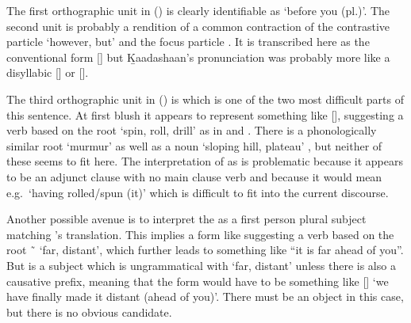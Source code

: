 The first orthographic unit  in (\lastx) is clearly identifiable as  ‘before you (pl.)’.
The second unit  is probably a rendition of a common contraction of the contrastive particle  ‘however, but’ and the focus particle .
It is transcribed here as the conventional form  [] but Ḵaadashaan’s pronunciation was probably more like a disyllabic  [] or  [].

The third orthographic unit in (\lastx) is  which is one of the two most difficult parts of this sentence.
At first blush it appears to represent something like  [], suggesting a verb based on the root  ‘spin, roll, drill’ as in  and  \parencites[07/11–14]{leer:1973}.
There is a phonologically similar root  ‘murmur’ \parencites[07/16]{leer:1973} as well as a noun  ‘sloping hill, plateau’ \parencites[07/17]{leer:1973}, but neither of these seems to fit here.
The interpretation of  as  is problematic because it appears to be an adjunct clause with no main clause verb and because it would mean e.g.\ ‘having rolled/spun (it)’ which is difficult to fit into the current discourse.

Another possible avenue is to interpret the  as a first person plural subject matching \citeauthor{swanton:1909}’s translation.
This implies a form like  suggesting a verb based on the root  \~\  ‘far, distant’, which further leads to something like “it is far ahead of you”.
But   is a subject which is ungrammatical with  ‘far, distant’ unless there is also a causative  prefix, meaning that the form would have to be something like  [] ‘we have finally made it distant (ahead of you)’.
There must be an object in this case, but there is no obvious candidate.

